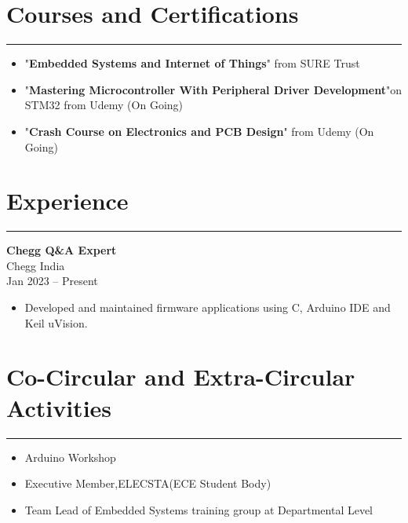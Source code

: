 \documentclass[10pt]{article}
\begin{document}
\section*{Courses and Certifications}
\hrule
\vspace{0.5em}
\begin{itemize}[leftmargin=*]
\item "\textbf{Embedded Systems and Internet of Things}" from SURE Trust
\item "\textbf{Mastering Microcontroller With Peripheral Driver Development}"on STM32 from Udemy (On Going)
\item "\textbf{Crash Course on Electronics and PCB Design}" from Udemy (On Going)
\end{itemize}

\section*{Experience}
\hrule
\begin{multicols}{2}
\textbf{Chegg Q\&A Expert} \\
Chegg India \\
Jan 2023 – Present\\
\columnbreak
\begin{itemize}[leftmargin=*]
\item Developed and maintained firmware applications using C, Arduino IDE and Keil uVision.
\end{itemize}
\end{multicols}

\section*{Co-Circular and Extra-Circular Activities}
\hrule
\begin{multicols}{2}
\begin{itemize}[leftmargin=*]
\item Arduino Workshop
\item Executive Member,ELECSTA(ECE Student Body)
\end{itemize}
\columnbreak
\begin{itemize}
\item Team Lead of Embedded Systems training group at Departmental Level
\end{itemize}
\end{multicols}
\end{document}
